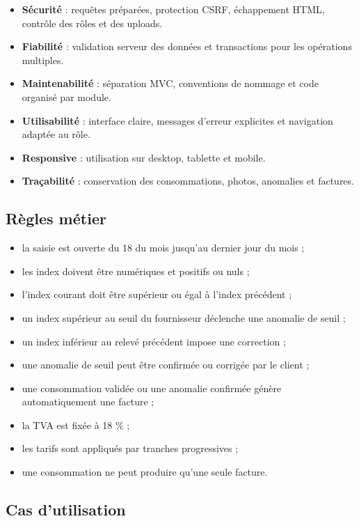 \begin{itemize}[leftmargin=*]
  \item \textbf{Sécurité} : requêtes préparées, protection CSRF, échappement HTML, contrôle des rôles et des uploads.
  \item \textbf{Fiabilité} : validation serveur des données et transactions pour les opérations multiples.
  \item \textbf{Maintenabilité} : séparation MVC, conventions de nommage et code organisé par module.
  \item \textbf{Utilisabilité} : interface claire, messages d'erreur explicites et navigation adaptée au rôle.
  \item \textbf{Responsive} : utilisation sur desktop, tablette et mobile.
  \item \textbf{Traçabilité} : conservation des consommations, photos, anomalies et factures.
\end{itemize}

\subsection{Règles métier}

\begin{itemize}[leftmargin=*]
  \item la saisie est ouverte du 18 du mois jusqu'au dernier jour du mois ;
  \item les index doivent être numériques et positifs ou nuls ;
  \item l'index courant doit être supérieur ou égal à l'index précédent ;
  \item un index supérieur au seuil du fournisseur déclenche une anomalie de seuil ;
  \item un index inférieur au relevé précédent impose une correction ;
  \item une anomalie de seuil peut être confirmée ou corrigée par le client ;
  \item une consommation validée ou une anomalie confirmée génère automatiquement une facture ;
  \item la TVA est fixée à 18 \% ;
  \item les tarifs sont appliqués par tranches progressives ;
  \item une consommation ne peut produire qu'une seule facture.
\end{itemize}

\subsection{Cas d'utilisation}

